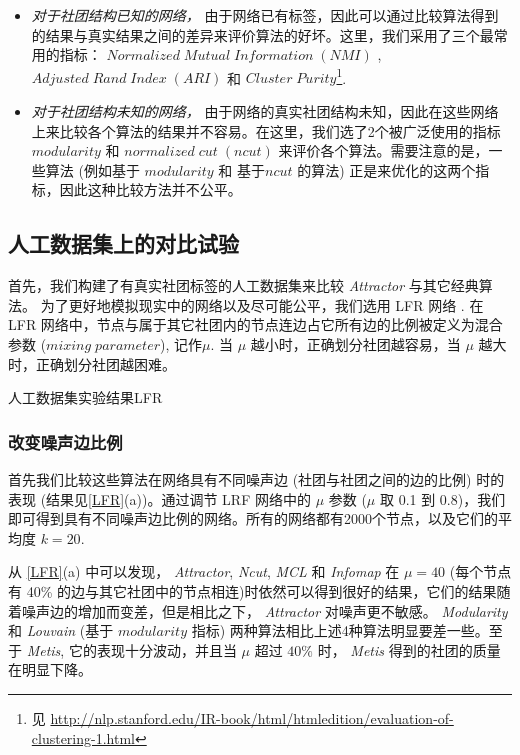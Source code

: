 \begin{itemize}
\item \emph{对于社团结构已知的网络，}  由于网络已有标签，因此可以通过比较算法得到的结果与真实结果之间的差异来评价算法的好坏。这里，我们采用了三个最常用的指标： $Normalized \; Mutual \; Information \;(NMI)$ , $Adjusted \; Rand \; Index \;(ARI)$  和 $Cluster \; Purity$\footnote{见 \url{http://nlp.stanford.edu/IR-book/html/htmledition/evaluation-of-clustering-1.html}}. 
\item \emph{对于社团结构未知的网络，}  由于网络的真实社团结构未知，因此在这些网络上来比较各个算法的结果并不容易。在这里，我们选了2个被广泛使用的指标 $modularity$ 和 $normalized \; cut \;(ncut)$ 来评价各个算法。需要注意的是，一些算法 (例如基于 $modularity$ 和 基于$ncut$ 的算法) 正是来优化的这两个指标，因此这种比较方法并不公平。\par
\end{itemize}

\subsection{人工数据集上的对比试验}
首先，我们构建了有真实社团标签的人工数据集来比较 \emph{Attractor} 与其它经典算法。 为了更好地模拟现实中的网络以及尽可能公平，我们选用 LFR 网络 . 在 LFR 网络中，节点与属于其它社团内的节点连边占它所有边的比例被定义为混合参数 ($mixing\;parameter$), 记作$\mu$. 当 $\mu$ 越小时，正确划分社团越容易，当 $\mu$ 越大时，正确划分社团越困难。

\begin{pics}[htbp]{人工数据集实验结果}{LFR}
\end{pics}

\subsubsection{改变噪声边比例} 
首先我们比较这些算法在网络具有不同噪声边 (社团与社团之间的边的比例) 时的表现 (结果见\ref{LFR}(a))。通过调节 LRF 网络中的 $\mu$ 参数 ($\mu$ 取 0.1 到 0.8)，我们即可得到具有不同噪声边比例的网络。所有的网络都有2000个节点，以及它们的平均度 $k=20$. \par
从 \ref{LFR}(a) 中可以发现， \emph{Attractor}, \emph{Ncut}, \emph{MCL} 和 \emph{Infomap} 在 $\mu=40$ (每个节点有 40\% 的边与其它社团中的节点相连)时依然可以得到很好的结果，它们的结果随着噪声边的增加而变差，但是相比之下， \emph{Attractor} 对噪声更不敏感。 \emph{Modularity} 和 \emph{Louvain} (基于 $modularity$ 指标) 两种算法相比上述4种算法明显要差一些。至于 \emph{Metis}, 它的表现十分波动，并且当 $\mu$ 超过 $40\%$ 时， \emph{Metis} 得到的社团的质量在明显下降。


